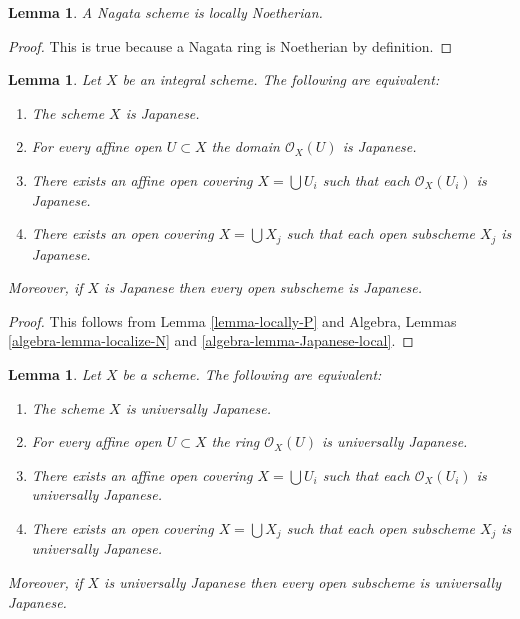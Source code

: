 \documentclass{stacks-project}
\theoremstyle{plain}
\newtheorem{lemma}[subsection]{Lemma}
\theoremstyle{definition}
\theoremstyle{remark}
\numberwithin{equation}{subsection}
\begin{document}
\begin{lemma}
\label{lemma-nagata-locally-Noetherian}
A Nagata scheme is locally Noetherian.
\end{lemma}

\begin{proof}
This is true because a Nagata ring is Noetherian by definition.
\end{proof}

\begin{lemma}
\label{lemma-locally-Japanese}
Let $X$ be an integral scheme. The following are equivalent:
\begin{enumerate}
\item The scheme $X$ is Japanese.
\item For every affine open $U \subset X$ the domain $\mathcal{O}_X(U)$
is Japanese.
\item There exists an affine open covering $X = \bigcup U_i$
such that each $\mathcal{O}_X(U_i)$ is Japanese.
\item There exists an open covering $X = \bigcup X_j$
such that each open subscheme $X_j$ is Japanese.
\end{enumerate}
Moreover, if $X$ is Japanese then every open subscheme
is Japanese.
\end{lemma}

\begin{proof}
This follows from Lemma \ref{lemma-locally-P} and
Algebra, Lemmas \ref{algebra-lemma-localize-N} and
\ref{algebra-lemma-Japanese-local}.
\end{proof}

\begin{lemma}
\label{lemma-locally-universally-Japanese}
Let $X$ be a scheme. The following are equivalent:
\begin{enumerate}
\item The scheme $X$ is universally Japanese.
\item For every affine open $U \subset X$ the ring $\mathcal{O}_X(U)$
is universally Japanese.
\item There exists an affine open covering $X = \bigcup U_i$
such that each $\mathcal{O}_X(U_i)$ is universally Japanese.
\item There exists an open covering $X = \bigcup X_j$
such that each open subscheme $X_j$ is universally Japanese.
\end{enumerate}
Moreover, if $X$ is universally Japanese then every open subscheme
is universally Japanese.
\end{lemma}
\end{document}
